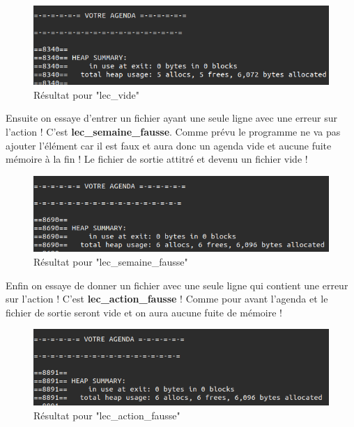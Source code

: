 \documentclass[12pt,french]{article} %
\begin{document}
\begin{figure}[H]
	\includegraphics[scale=0.6]{s-vide.png}
	\centering
	\caption{Résultat pour "lec\_vide"}
\end{figure}

Ensuite on essaye d'entrer un fichier ayant une seule ligne avec une erreur sur l'action ! C'est \textbf{lec\_semaine\_fausse}. Comme prévu le programme ne va pas ajouter l'élément car il est faux et aura donc un agenda vide et aucune fuite mémoire à la fin ! Le fichier de sortie attitré et devenu un fichier vide !\newline

\begin{figure}[H]
	\includegraphics[scale=0.6]{s-fausse.png}
	\centering
	\caption{Résultat pour "lec\_semaine\_fausse"}
\end{figure}

Enfin on essaye de donner un fichier avec une seule ligne qui contient une erreur sur l'action ! C'est \textbf{lec\_action\_fausse} ! Comme pour avant l'agenda et le fichier de sortie seront vide et on aura aucune fuite de mémoire !\newline

\begin{figure}[H]
	\includegraphics[scale=0.6]{a-fausse.png}
	\centering
	\caption{Résultat pour "lec\_action\_fausse"}
\end{figure}
\end{document}
